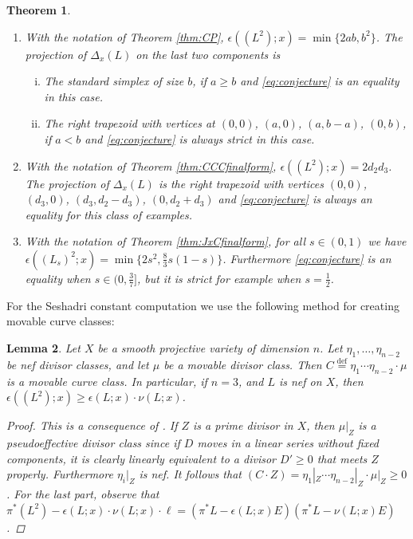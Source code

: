 \documentclass[12pt]{amsart}
\newtheorem{lemma}{Lemma}[section]
\newtheorem{theorem}[lemma]{Theorem}
\theoremstyle{definition}
\renewcommand{\geq}{\geqslant}
\newcommand{\deq}{\ensuremath{\stackrel{\textrm{def}}{=}}}
\newcommand{\inob}[2]{\ensuremath{{\Delta}_{#1}(#2)}}
\newcommand{\?}{ \circled{{\large\bf ?}}}
\begin{document}
\begin{theorem}\label{thm:Seshdaricurveconjecture}$ $
	\begin{enumerate}[(1)]
		\item With the notation of Theorem \ref{thm:CP},
$\epsilon((L^2);x)=\min\{2ab,b^2\}$.
		The projection of $\inob{x}{L}$ on the last two components is
		\begin{enumerate}[i.]
			\item The standard simplex of size $b$, if $a\geq b$ and \eqref{eq:conjecture} is an equality in this case.
			\item The right trapezoid with vertices at $(0,0)$, $(a,0)$, $(a,b-a)$, $(0,b)$, if $a<b$ and \eqref{eq:conjecture} is always strict in this case.
		\end{enumerate}
\smallskip		
	\item With the notation of Theorem \ref{thm:CCCfinalform}, 
$\epsilon((L^2);x)=2d_2d_3$.
	The projection of $\inob{x}{L}$ is the right trapezoid with vertices $(0,0)$, $(d_3,0)$, $(d_3,d_2-d_3)$, $(0,d_2+d_3)$ and \eqref{eq:conjecture} is always an equality for this class of examples.
\smallskip

\item With the notation of Theorem \ref{thm:JxCfinalform}, for all $s\in(0,1)$ we have
$\epsilon((L_s)^2;x)=\min\bigl\{2s^2,\frac 83s(1-s)\bigr\}$.
Furthermore \eqref{eq:conjecture} is an equality when $s\in(0,\frac 37]$, but it is strict for example when $s=\frac 12$.
	\end{enumerate}
\end{theorem}


For the Seshadri constant computation we use the following method for creating movable curve classes:

\begin{lemma}\label{lem:createmovable}
	Let $X$ be a smooth projective variety of dimension $n$. Let $\eta_1,\ldots,\eta_{n-2}$ be nef divisor classes, and let $\mu$ be a movable divisor class. Then $C\deq\eta_1\cdots\eta_{n-2}\cdot\mu$ is a movable curve class. In particular, if $n=3$, and $L$ is nef on $X$, then $\epsilon((L^2);x)\geq\epsilon(L;x)\cdot\nu(L;x)$.
\begin{proof} 	
	This is a consequence of \cite{BDPP}. If $Z$ is a prime divisor in $X$, then $\mu|_Z$ is a pseudoeffective divisor class since if $D$ moves in a linear series without fixed components, it is clearly linearly equivalent to a divisor $D'\geq 0$ that meets $Z$ properly. Furthermore ${\eta_i}|_Z$ is nef. It follows that $(C\cdot Z)={\eta_1}|_Z\cdots{\eta_{n-2}}|_Z\cdot\mu|_Z\geq 0$. For the last part, observe that $\pi^*(L^2)-\epsilon(L;x)\cdot\nu(L;x)\cdot \ell=(\pi^*L-\epsilon(L;x)E)(\pi^*L-\nu(L;x)E)$.
\end{proof} 
\end{lemma}
\end{document}
